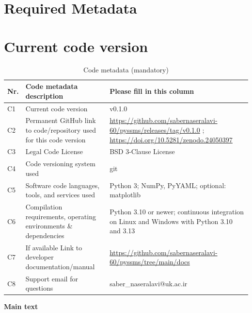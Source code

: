 \documentclass[preprint,12pt, a4paper]{elsarticle}
\begin{document}
\section*{Required Metadata}

\section*{Current code version}

\begin{table}[!h]
\begin{tabular}{|l|p{6.5cm}|p{6.5cm}|}
\hline
\textbf{Nr.} & \textbf{Code metadata description} & \textbf{Please fill in this column} \\
\hline
C1 & Current code version & v0.1.0 \\
\hline
C2 & Permanent GitHub link to code/repository used for this code version & \url{https://github.com/sabernaseralavi-60/pyssms/releases/tag/v0.1.0} ; \url{https://doi.org/10.5281/zenodo.24050397} \\
\hline
C3 & Legal Code License & BSD 3-Clause License \\
\hline
C4 & Code versioning system used & git \\
\hline
C5 & Software code languages, tools, and services used & Python 3; NumPy, PyYAML; optional: matplotlib \\
\hline
C6 & Compilation requirements, operating environments \& dependencies & Python 3.10 or newer; continuous integration on Linux and Windows with Python 3.10 and 3.13 \\
\hline
C7 & If available Link to developer documentation/manual & \url{https://github.com/sabernaseralavi-60/pyssms/tree/main/docs} \\
\hline
C8 & Support email for questions & saber\_naseralavi@uk.ac.ir \\
\hline
\end{tabular}
\caption{Code metadata (mandatory)}
\label{tab:meta}
\end{table}

\textbf{Main text}\\
\end{document}
